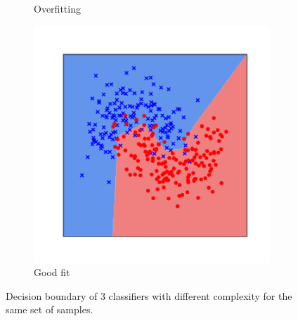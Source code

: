 \begin{figure}[t]
\begin{subfigure}[b]{0.32\textwidth}
    \caption{Overfitting}
    \label{figure:ch2-fitting_points_b}
  \end{subfigure}
  \hfill
  \begin{subfigure}[b]{0.32\textwidth}
    \includegraphics[width=0.98\textwidth]{figures/main/ch2-background/normal.pdf}
    \caption{Good fit}
    \label{figure:ch2-fitting_points_c}
  \end{subfigure}
  \caption{
    Decision boundary of 3 classifiers with different complexity for the same set of samples.
  }
  \label{figure:ch2-fitting_points}
\end{figure}



